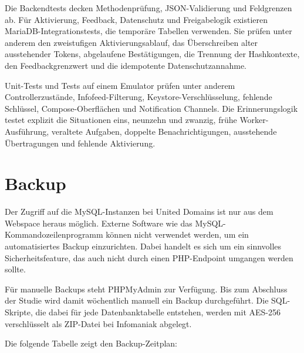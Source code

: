 Die Backendtests decken Methodenprüfung, JSON-Validierung und Feldgrenzen ab. Für Aktivierung, Feedback, Datenschutz und Freigabelogik existieren MariaDB-Integrationstests, die temporäre Tabellen verwenden. Sie prüfen unter anderem den zweistufigen Aktivierungsablauf, das Überschreiben alter ausstehender Tokens, abgelaufene Bestätigungen, die Trennung der Hashkontexte, den Feedbackgrenzwert und die idempotente Datenschutzannahme.

Unit-Tests und Tests auf einem Emulator prüfen unter anderem Controllerzustände, Infofeed-Filterung, Keystore-Verschlüsselung, fehlende Schlüssel, Compose-Oberflächen und Notification Channels. Die Erinnerungslogik testet explizit die Situationen eins, neunzehn und zwanzig, frühe Worker-Ausführung, veraltete Aufgaben, doppelte Benachrichtigungen, ausstehende Übertragungen und fehlende Aktivierung.

\section{Backup}

Der Zugriff auf die MySQL-Instanzen bei United Domains ist nur aus dem Webspace heraus möglich. Externe Software wie das MySQL-Kommandozeilenpro\-gramm können nicht verwendet werden, um ein automatisiertes Backup einzurichten. Dabei handelt es sich um ein sinnvolles Sicherheitsfeature, das auch nicht durch einen PHP-Endpoint umgangen werden sollte.

Für manuelle Backups steht PHPMyAdmin zur Verfügung. Bis zum Abschluss der Studie wird damit wöchentlich manuell ein Backup durchgeführt. Die SQL-Skripte, die dabei für jede Datenbanktabelle entstehen, werden mit AES-256 verschlüsselt als ZIP-Datei bei Infomaniak abgelegt. 

Die folgende Tabelle zeigt den Backup-Zeitplan:

